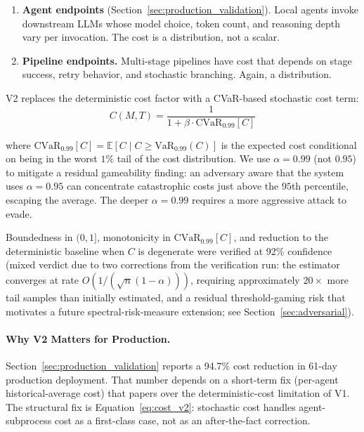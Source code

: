 \begin{enumerate}
    \item \textbf{Agent endpoints} (Section~\ref{sec:production_validation}). Local agents invoke downstream LLMs whose model choice, token count, and reasoning depth vary per invocation. The cost is a distribution, not a scalar.
    \item \textbf{Pipeline endpoints.} Multi-stage pipelines have cost that depends on stage success, retry behavior, and stochastic branching. Again, a distribution.
\end{enumerate}

V2 replaces the deterministic cost factor with a CVaR-based stochastic cost term:
\begin{equation}
\label{eq:cost_v2}
C(M, T) = \frac{1}{1 + \beta \cdot \text{CVaR}_{0.99}[C]}
\end{equation}

where $\text{CVaR}_{0.99}[C] = \mathbb{E}[C \mid C \geq \text{VaR}_{0.99}(C)]$ is the expected cost conditional on being in the worst $1\%$ tail of the cost distribution. We use $\alpha = 0.99$ (not $0.95$) to mitigate a residual gameability finding: an adversary aware that the system uses $\alpha = 0.95$ can concentrate catastrophic costs just above the $95$th percentile, escaping the average. The deeper $\alpha = 0.99$ requires a more aggressive attack to evade.

Boundedness in $(0, 1]$, monotonicity in $\text{CVaR}_{0.99}[C]$, and reduction to the deterministic baseline when $C$ is degenerate were verified at 92\% confidence (mixed verdict due to two corrections from the verification run: the estimator converges at rate $O(1/(\sqrt{n}(1 - \alpha)))$, requiring approximately $20\times$ more tail samples than initially estimated, and a residual threshold-gaming risk that motivates a future spectral-risk-measure extension; see Section~\ref{sec:adversarial}).

\paragraph{Why V2 Matters for Production.} Section~\ref{sec:production_validation} reports a 94.7\% cost reduction in 61-day production deployment. That number depends on a short-term fix (per-agent historical-average cost) that papers over the deterministic-cost limitation of V1. The structural fix is Equation~\ref{eq:cost_v2}: stochastic cost handles agent-subprocess cost as a first-class case, not as an after-the-fact correction.
